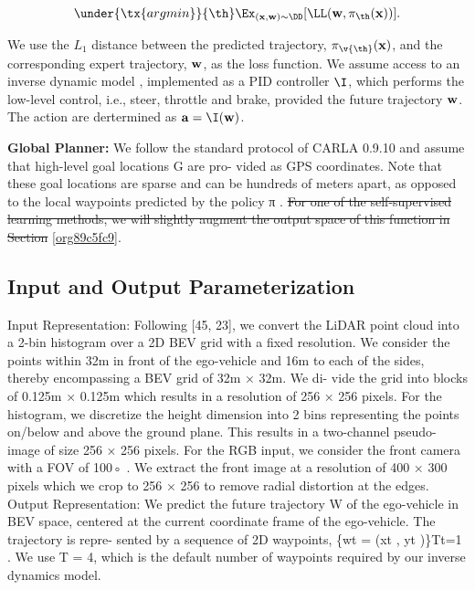 \documentclass[letterpaper, 12pt]{article}
\theoremstyle{definition}
\theoremstyle{definition}
\theoremstyle{definition}
\theoremstyle{definition}
\theoremstyle{definition}
\begin{document}
\[\under{\tx{argmin }}{{\th}} \Ex_{(\bf x,\bf w)\sim \DD} [\LL(\bf
   w,\pi_{\th}(\bf x))].\]

We use the \(L_{1}\) distance between the predicted trajectory,
\(\pi_{\v{\th}}(\bf x)\), and the corresponding expert trajectory, \(\bf w\),
as the loss function. We assume access to an inverse dynamic model
\cite{10.2307/j.ctt183ph6v}, implemented as a PID controller \(\I\), which
performs the low-level control, i.e., steer, throttle and brake, provided the
future trajectory \(\bf w\). The action are dertermined as \(\bf a=\I(\bf w)\).

\textbf{Global Planner:} We follow the standard protocol of CARLA 0.9.10 and assume that
high-level goal locations G are pro- vided as GPS coordinates. Note that
these goal locations are sparse and can be hundreds of meters apart, as
opposed to the local waypoints predicted by the policy π .
\sout{For one of the self-supervised learning methods, we will slightly augment
the output space of this function in Section} \ref{org89c5fc9}.

\subsection{Input and Output Parameterization}
\label{sec:org11ee5bc}
Input Representation: Following [45, 23], we convert the
LiDAR point cloud into a 2-bin histogram over a 2D BEV
grid with a fixed resolution. We consider the points within
32m in front of the ego-vehicle and 16m to each of the sides,
thereby encompassing a BEV grid of 32m × 32m. We di-
vide the grid into blocks of 0.125m × 0.125m which results
in a resolution of 256 × 256 pixels. For the histogram, we
discretize the height dimension into 2 bins representing the
points on/below and above the ground plane. This results in
a two-channel pseudo-image of size 256 × 256 pixels. For
the RGB input, we consider the front camera with a FOV
of 100◦ . We extract the front image at a resolution of 400
× 300 pixels which we crop to 256 × 256 to remove radial
distortion at the edges.
Output Representation: We predict the future trajectory
W of the ego-vehicle in BEV space, centered at the current
coordinate frame of the ego-vehicle. The trajectory is repre-
sented by a sequence of 2D waypoints, \{wt = (xt , yt )\}Tt=1 .
We use T = 4, which is the default number of waypoints
required by our inverse dynamics model.
\end{document}

